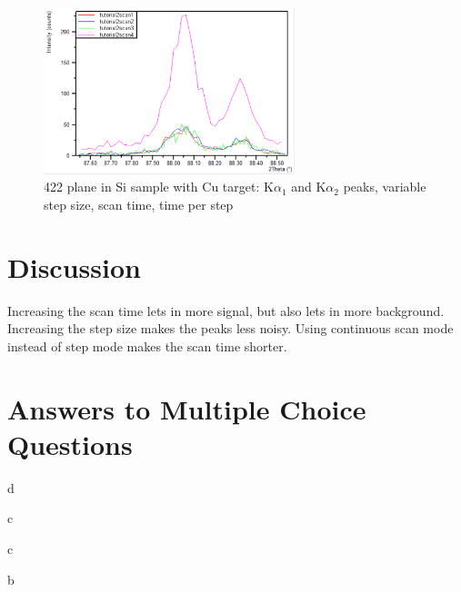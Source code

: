 \documentclass{article}
\begin{document}
\begin{figure}[h]
\begin{center}
\includegraphics[width=0.65\textwidth]{combinedgraph} %
\caption{{422} plane in Si sample with Cu target: K$\alpha_1$ and K$\alpha_2$ peaks, variable step size, scan time, time per step}
\end{center}
\end{figure}


\section{Discussion}
Increasing the scan time lets in more signal, but also lets in more background. Increasing the step size makes the peaks less noisy. Using continuous scan mode instead of step mode makes the scan time shorter. 



\section{Answers to Multiple Choice Questions}
\begin{enumerate}[label=(\roman*)]
\begin{item}
d
\end{item}
\begin{item}
c
\end{item}
\begin{item}
c
\end{item}
\begin{item}
b
\end{item}

\end{enumerate}






\end{document}
